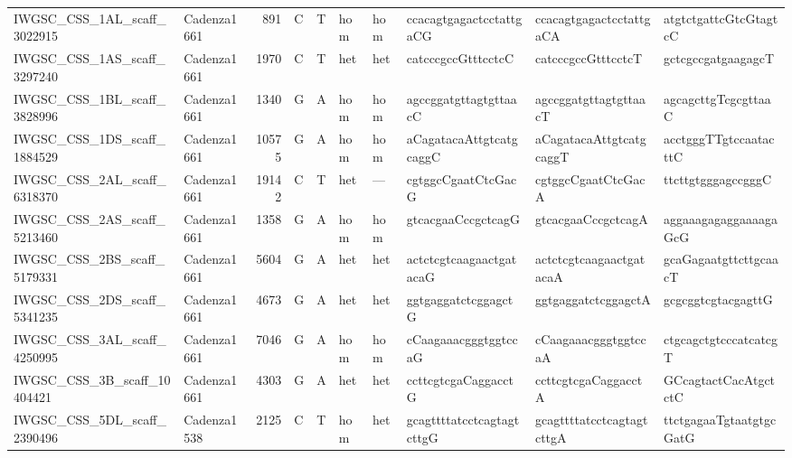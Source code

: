 \begin{tabular}{llrlllllll}
 IWGSC\_CSS\_1AL\_scaff\_3022915  & Cadenza1661 &        891 & C         & T        & hom            & hom         & ccacagtgagactcctattgaCG   & ccacagtgagactcctattgaCA   & atgtctgattcGtcGtagtcC     \\
 IWGSC\_CSS\_1AS\_scaff\_3297240  & Cadenza1661 &       1970 & C         & T        & het            & het         & catcccgccGtttcctcC        & catcccgccGtttcctcT        & gctcgccgatgaagagcT        \\
 IWGSC\_CSS\_1BL\_scaff\_3828996  & Cadenza1661 &       1340 & G         & A        & hom            & hom         & agccggatgttagtgttaacC     & agccggatgttagtgttaacT     & agcagcttgTcgcgttaaC       \\
 IWGSC\_CSS\_1DS\_scaff\_1884529  & Cadenza1661 &      10575 & G         & A        & hom            & hom         & aCagatacaAttgtcatgcaggC   & aCagatacaAttgtcatgcaggT   & acctgggTTgtccaatacttC     \\
 IWGSC\_CSS\_2AL\_scaff\_6318370  & Cadenza1661 &      19142 & C         & T        & het            & ---         & cgtggcCgaatCtcGacG        & cgtggcCgaatCtcGacA        & ttcttgtgggagccgggC        \\
 IWGSC\_CSS\_2AS\_scaff\_5213460  & Cadenza1661 &       1358 & G         & A        & hom            & hom         & gtcacgaaCccgctcagG        & gtcacgaaCccgctcagA        & aggaaagagaggaaaagaGcG     \\
 IWGSC\_CSS\_2BS\_scaff\_5179331  & Cadenza1661 &       5604 & G         & A        & het            & het         & actctcgtcaagaactgatacaG   & actctcgtcaagaactgatacaA   & gcaGagaatgttcttgcaacT     \\
 IWGSC\_CSS\_2DS\_scaff\_5341235  & Cadenza1661 &       4673 & G         & A        & het            & het         & ggtgaggatctcggagctG       & ggtgaggatctcggagctA       & gcgcggtcgtacgagttG        \\
 IWGSC\_CSS\_3AL\_scaff\_4250995  & Cadenza1661 &       7046 & G         & A        & hom            & hom         & cCaagaaacgggtggtccaG      & cCaagaaacgggtggtccaA      & ctgcagctgtcccatcatcgT     \\
 IWGSC\_CSS\_3B\_scaff\_10404421  & Cadenza1661 &       4303 & G         & A        & het            & het         & ccttcgtcgaCaggacctG       & ccttcgtcgaCaggacctA       & GCcagtactCacAtgctctC      \\
 IWGSC\_CSS\_5DL\_scaff\_2390496  & Cadenza1538 &       2125 & C         & T        & hom            & het         & gcagttttatcctcagtagtcttgG & gcagttttatcctcagtagtcttgA & ttctgagaaTgtaatgtgcGatG   \\

\end{tabular}
